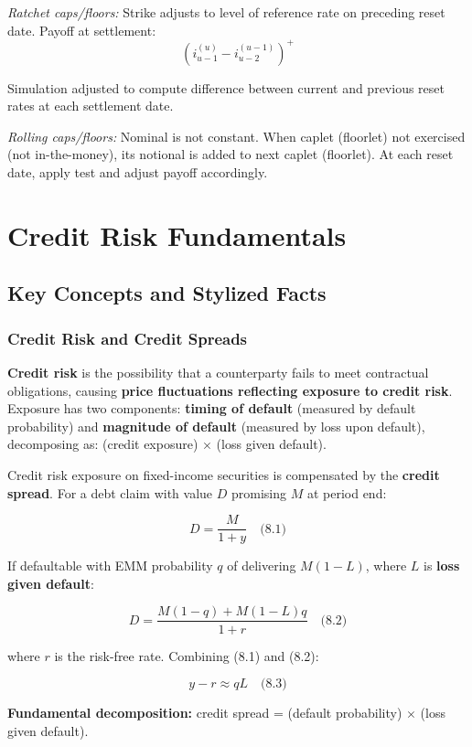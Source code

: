 \documentclass[12pt,a4paper]{article}
\begin{document}
\textit{Ratchet caps/floors:} Strike adjusts to level of reference rate on preceding reset date. Payoff at settlement:
$$\left(i_{u-1}^{(u)} - i_{u-2}^{(u-1)}\right)^+$$

Simulation adjusted to compute difference between current and previous reset rates at each settlement date.

\textit{Rolling caps/floors:} Nominal is not constant. When caplet (floorlet) not exercised (not in-the-money), its notional is added to next caplet (floorlet). At each reset date, apply test and adjust payoff accordingly.



\section{Credit Risk Fundamentals}

\subsection{Key Concepts and Stylized Facts}

\subsubsection{Credit Risk and Credit Spreads}

\textbf{Credit risk} is the possibility that a counterparty fails to meet contractual obligations, causing \textbf{price fluctuations reflecting exposure to credit risk}. Exposure has two components: \textbf{timing of default} (measured by default probability) and \textbf{magnitude of default} (measured by loss upon default), decomposing as: (credit exposure) $\times$ (loss given default).

Credit risk exposure on fixed-income securities is compensated by the \textbf{credit spread}. For a debt claim with value $D$ promising $M$ at period end: 

$$D = \frac{M}{1 + y} \quad \text{(8.1)}$$

If defaultable with EMM probability $q$ of delivering $M(1-L)$, where $L$ is \textbf{loss given default}:

$$D = \frac{M(1-q) + M(1-L)q}{1 + r} \quad \text{(8.2)}$$

where $r$ is the risk-free rate. Combining (8.1) and (8.2):

$$y - r \approx qL \quad \text{(8.3)}$$

\textbf{Fundamental decomposition:} credit spread = (default probability) $\times$ (loss given default).
\end{document}
